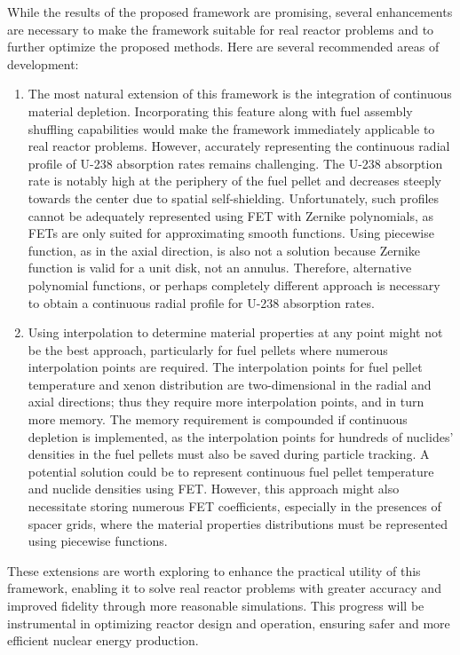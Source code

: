 While the results of the proposed framework are promising, several enhancements are necessary to make the framework suitable for real reactor problems and to further optimize the proposed methods. Here are several recommended areas of development:
\begin{enumerate}
    \item The most natural extension of this framework is the integration of continuous material depletion. Incorporating this feature along with fuel assembly shuffling capabilities would make the framework immediately applicable to real reactor problems. However, accurately representing the continuous radial profile of U-238 absorption rates remains challenging. The U-238 absorption rate is notably high at the periphery of the fuel pellet and decreases steeply towards the center due to spatial self-shielding. Unfortunately, such profiles cannot be adequately represented using FET with Zernike polynomials, as FETs are only suited for approximating smooth functions. Using piecewise function, as in the axial direction, is also not a solution because Zernike function is valid for a unit disk, not an annulus. Therefore, alternative polynomial functions, or perhaps completely different approach is necessary to obtain a continuous radial profile for U-238 absorption rates.

    \item Using interpolation to determine material properties at any point  might not be the best approach, particularly for fuel pellets where numerous interpolation points are required. The interpolation points for fuel pellet temperature and xenon distribution are two-dimensional in the radial and axial directions; thus they require more interpolation points, and in turn more memory. The memory requirement is compounded if continuous depletion is implemented, as the interpolation points for hundreds of nuclides' densities in the fuel pellets must also be saved during particle tracking. A potential solution could be to represent continuous fuel pellet temperature and nuclide densities using FET. However, this approach might also necessitate storing numerous FET coefficients, especially in the presences of spacer grids, where the material properties distributions must be represented using piecewise functions.
\end{enumerate}

These extensions are worth exploring to enhance the practical utility of this framework, enabling it to solve real reactor problems with greater accuracy and improved fidelity through more reasonable simulations. This progress will be instrumental in optimizing reactor design and operation, ensuring safer and more efficient nuclear energy production.